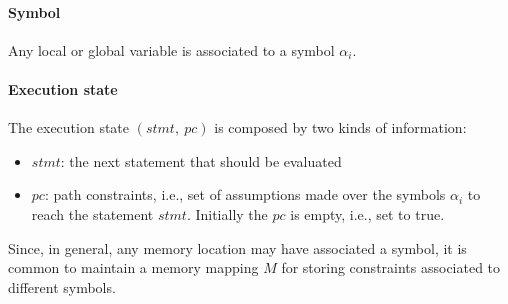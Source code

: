 \paragraph{Symbol} Any local or global variable is associated to a symbol $\alpha_i$. 
\paragraph{Execution state} The execution state $(stmt,~pc)$ is composed by two kinds of information:
\begin{itemize}
  \item $stmt$: the next statement that should be evaluated
  \item $pc$: path constraints, i.e., set of assumptions made over the symbols $\alpha_i$ to reach the statement $stmt$. Initially the $pc$ is empty, i.e., set to true.
\end{itemize}
Since, in general, any memory location may have associated a symbol, it is common to maintain a memory mapping $M$ for storing constraints associated to different symbols.

